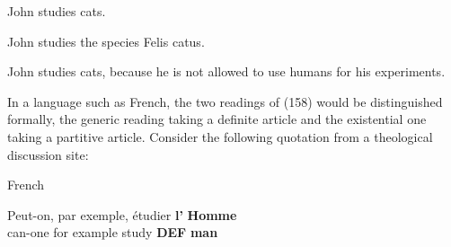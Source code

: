 
\item 

\label{bkm:Ref107049066}John studies cats.


\item 

\label{bkm:Ref107049087}John studies the species Felis catus.


\item 

\label{bkm:Ref107049114}John studies cats, because he is not allowed to use humans for his experiments. 



In a language such as French, the two readings of (158) would be distinguished formally, the generic reading taking a definite article and the existential one taking a partitive article. Consider the following quotation from a theological discussion site:


\item 

French



 \ea\label{}
\gll Peut-on,  par  exemple,  étudier  \textbf{l’} \textbf{ Homme}\\


can-one  for  example  study  \textbf{DEF } \textbf{man}\\

